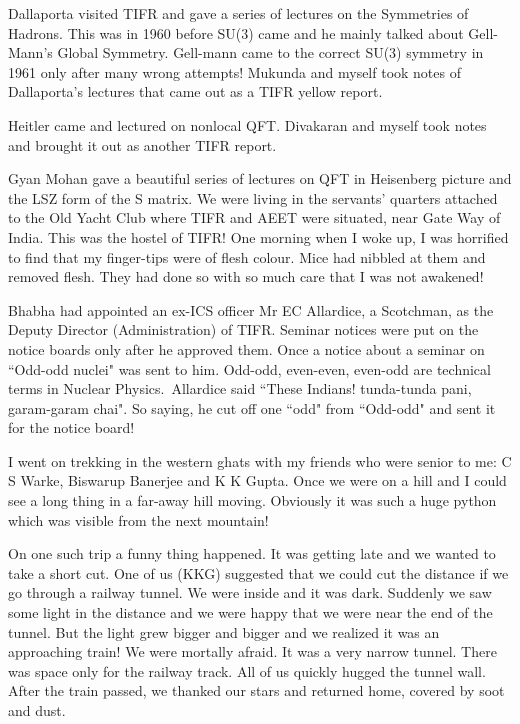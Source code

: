 Dallaporta visited TIFR and gave a series of lectures on the Symmetries 
of Hadrons. This was in 1960 before SU(3) came and he mainly talked 
about Gell-Mann's Global Symmetry. Gell-mann came to the correct SU(3) 
symmetry in 1961 only after many wrong attempts! Mukunda and myself took 
notes of Dalla\-porta's lectures that came out as a TIFR yellow report.

Heitler came and lectured on nonlocal QFT. Divakaran and myself took 
notes and brought it out as another TIFR report.

Gyan Mohan gave a beautiful series of lectures on QFT in Heisenberg 
picture and the LSZ form of the S matrix.
\vskip 1pt
We were living in the servants' quarters attached to the Old Yacht Club 
where TIFR and AEET were situated, near Gate Way of India. This was the 
hostel of TIFR! One morning when I woke up, I was horrified to find that 
my finger-tips were of flesh colour. Mice had nibbled at them and 
removed flesh. They had done so with so much care that I was not 
awakened!

Bhabha had appointed an ex-ICS officer Mr EC Allardice, a Scotchman, 
as the Deputy Director (Administration) of TIFR. Se\-minar notices were 
put on the notice boards only after he approved them. Once a notice 
about a seminar on ``Odd-odd nuclei" was sent to him. Odd-odd, even-even, 
even-odd are technical terms in Nuclear Physics.\ Allardice said ``These 
Indians! tunda-tunda pani, garam-garam chai". So saying, he cut off one 
``odd" from ``Odd-odd" and sent it for the notice board!

I went on trekking in the western ghats with my friends who were senior 
to me: C S Warke, Biswarup Banerjee and K K Gupta. Once we were on a 
hill and I could see a long thing in a far-away hill moving. Obviously 
it was such a huge python which was visi\-ble from the next mountain!
 
On one such trip a funny thing happened. It was getting late and we 
wanted to take a short cut. One of us (KKG) suggested that we could cut 
the distance if we go through a railway tunnel. We were inside and it 
was dark. Suddenly we saw some light in the distance and we were happy 
that we were near the end of the tunnel. But the light grew bigger and 
bigger and we realized it was an approaching train! We were mortally 
afraid. It was a very narrow tunnel. There was space only for the 
railway track. All of us quickly hugged the tunnel wall. After the train 
passed, we thanked our stars and returned home, covered by soot and 
dust.

